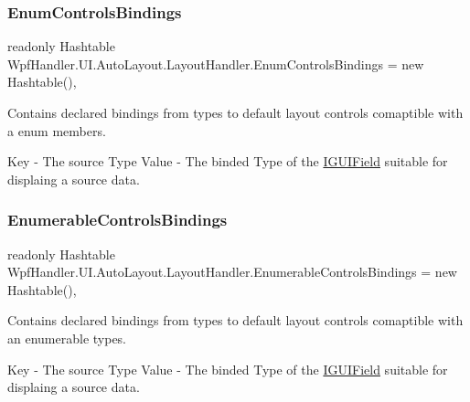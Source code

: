 \subsubsection{\texorpdfstring{Enum\+Controls\+Bindings}{EnumControlsBindings}}
{\footnotesize\ttfamily readonly Hashtable Wpf\+Handler.\+U\+I.\+Auto\+Layout.\+Layout\+Handler.\+Enum\+Controls\+Bindings = new Hashtable()\hspace{0.3cm}{\ttfamily [static]}, {\ttfamily [private]}}



Contains declared bindings from types to default layout controls comaptible with a enum members. 

Key -\/ The source Type Value -\/ The binded Type of the \mbox{\hyperlink{interface_wpf_handler_1_1_u_i_1_1_auto_layout_1_1_i_g_u_i_field}{I\+G\+U\+I\+Field}} suitable for displaing a source data. \mbox{\label{class_wpf_handler_1_1_u_i_1_1_auto_layout_1_1_layout_handler_a9838c1e408adbcb072a03521be50e6fe}} 
\subsubsection{\texorpdfstring{Enumerable\+Controls\+Bindings}{EnumerableControlsBindings}}
{\footnotesize\ttfamily readonly Hashtable Wpf\+Handler.\+U\+I.\+Auto\+Layout.\+Layout\+Handler.\+Enumerable\+Controls\+Bindings = new Hashtable()\hspace{0.3cm}{\ttfamily [static]}, {\ttfamily [private]}}



Contains declared bindings from types to default layout controls comaptible with an enumerable types. 

Key -\/ The source Type Value -\/ The binded Type of the \mbox{\hyperlink{interface_wpf_handler_1_1_u_i_1_1_auto_layout_1_1_i_g_u_i_field}{I\+G\+U\+I\+Field}} suitable for displaing a source data. \mbox{\label{class_wpf_handler_1_1_u_i_1_1_auto_layout_1_1_layout_handler_afda300c91d5d5e45c7fb51d1154fcf4b}} 
